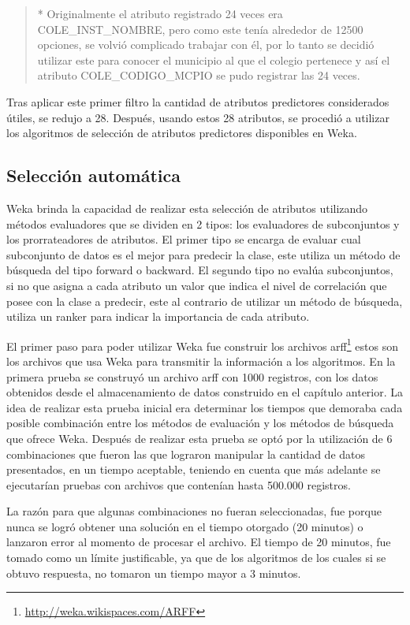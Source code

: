 \begin{quote}
* Originalmente el atributo registrado 24 veces era COLE_INST_NOMBRE, pero como este tenía alrededor de 12500 opciones, se volvió complicado trabajar con él, por lo tanto se decidió utilizar este para conocer el municipio al que el colegio pertenece y así el atributo COLE_CODIGO_MCPIO se pudo registrar las 24 veces.
\end{quote}
Tras aplicar este primer filtro la cantidad de atributos predictores considerados útiles, se redujo a 28.
Después, usando estos 28 atributos, se procedió a utilizar los algoritmos de selección de atributos predictores disponibles en Weka.
\subsection{Selección automática}
Weka brinda la capacidad de realizar esta selección de atributos utilizando métodos evaluadores que se dividen en 2 tipos: los evaluadores de subconjuntos y los prorrateadores de atributos. El primer tipo se encarga de evaluar cual subconjunto de datos es el mejor para predecir la clase, este utiliza un método de búsqueda del tipo forward o backward. El segundo tipo no evalúa subconjuntos, si no que asigna a cada atributo un valor que indica el nivel de correlación que posee con la clase a predecir, este al contrario de utilizar un método de búsqueda, utiliza un ranker para indicar la importancia de cada atributo.

El primer paso para poder utilizar Weka fue construir los archivos arff\footnote{\url{http://weka.wikispaces.com/ARFF}} estos son los archivos que usa Weka para transmitir la información a los algoritmos. En la primera prueba se construyó un archivo arff con 1000 registros, con los datos obtenidos desde el almacenamiento de datos construido en el capítulo anterior. La idea de realizar esta prueba inicial era determinar los tiempos que demoraba cada posible combinación entre los métodos de evaluación y los métodos de búsqueda que ofrece Weka. Después de realizar esta prueba se optó por la utilización de 6 combinaciones que fueron las que lograron manipular la cantidad de datos presentados, en un tiempo aceptable, teniendo en cuenta que más adelante se ejecutarían pruebas con archivos que contenían hasta 500.000 registros.

La razón para que algunas combinaciones no fueran seleccionadas, fue porque nunca se logró obtener una solución en el tiempo otorgado (20 minutos) o lanzaron error al momento de procesar el archivo. El tiempo de 20 minutos, fue tomado como un límite justificable, ya que de los algoritmos de los cuales si se obtuvo respuesta, no tomaron un tiempo mayor a 3 minutos.

